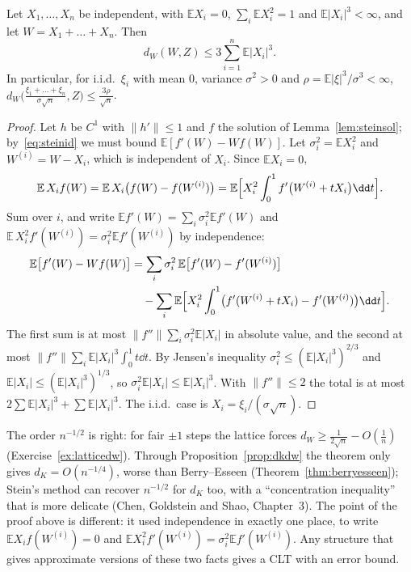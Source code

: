 \begin{theorem}\label{thm:steinclt}
Let $X_1,\dots,X_n$ be independent, with $\mathbb EX_i=0$, $\sum_i\mathbb EX_i^2=1$ and $\mathbb E|X_i|^3<\infty$, and let $W=X_1+\dots+X_n$. Then
\[
d_W(W,Z)\le3\sum_{i=1}^n\mathbb E|X_i|^3.
\]
In particular, for i.i.d.\ $\xi_i$ with mean $0$, variance $\sigma^2>0$ and $\rho=\mathbb E|\xi|^3/\sigma^3<\infty$,
$d_W\bigl(\frac{\xi_1+\dots+\xi_n}{\sigma\sqrt n},Z\bigr)\le\frac{3\rho}{\sqrt n}$.
\end{theorem}
\begin{proof}
Let $h$ be $C^1$ with $\|h'\|\le1$ and $f$ the solution of Lemma~\ref{lem:steinsol}; by~\eqref{eq:steinid} we must bound $\mathbb E[f'(W)-Wf(W)]$. Let
$\sigma_i^2=\mathbb EX_i^2$ and $W^{(i)}=W-X_i$, which is independent of $X_i$. Since $\mathbb EX_i=0$,
\[
\mathbb E\,X_if(W)=\mathbb E\,X_i\bigl(f(W)-f(W^{(i)})\bigr)=\mathbb E\Bigl[X_i^2\int_0^1f'\bigl(W^{(i)}+tX_i\bigr)\dd t\Bigr].
\]
Sum over $i$, and write $\mathbb Ef'(W)=\sum_i\sigma_i^2\mathbb Ef'(W)$ and $\mathbb E\,X_i^2f'(W^{(i)})=\sigma_i^2\mathbb Ef'(W^{(i)})$ by independence:
\[
\begin{aligned}
\mathbb E\bigl[f'(W)-Wf(W)\bigr]&=\sum_i\sigma_i^2\,\mathbb E\bigl[f'(W)-f'(W^{(i)})\bigr]\\
&\quad-\sum_i\mathbb E\Bigl[X_i^2\int_0^1\bigl(f'(W^{(i)}+tX_i)-f'(W^{(i)})\bigr)\dd t\Bigr].
\end{aligned}
\]
The first sum is at most $\|f''\|\sum_i\sigma_i^2\mathbb E|X_i|$ in absolute value, and the second at most $\|f''\|\sum_i\mathbb E|X_i|^3\int_0^1t\dd t$. By
Jensen's inequality $\sigma_i^2\le(\mathbb E|X_i|^3)^{2/3}$ and $\mathbb E|X_i|\le(\mathbb E|X_i|^3)^{1/3}$, so $\sigma_i^2\mathbb E|X_i|\le\mathbb E|X_i|^3$. With $\|f''\|\le2$
the total is at most $2\sum\mathbb E|X_i|^3+\sum\mathbb E|X_i|^3$. The i.i.d.\ case is $X_i=\xi_i/(\sigma\sqrt n)$.
\end{proof}

The order $n^{-1/2}$ is right: for fair $\pm1$ steps the lattice forces $d_W\ge\frac1{2\sqrt n}-O(\frac1n)$ (Exercise~\ref{ex:latticedw}). Through
Proposition~\ref{prop:dkdw} the theorem only gives $d_K=O(n^{-1/4})$, worse than Berry--Esseen (Theorem~\ref{thm:berryesseen}); Stein's method can recover
$n^{-1/2}$ for $d_K$ too, with a ``concentration inequality'' that is more delicate (Chen, Goldstein and Shao, Chapter~3). The point of the proof above is
different: it used independence in exactly one place, to write $\mathbb EX_if(W^{(i)})=0$ and $\mathbb EX_i^2f'(W^{(i)})=\sigma_i^2\mathbb Ef'(W^{(i)})$. Any structure
that gives approximate versions of these two facts gives a CLT with an error bound.

